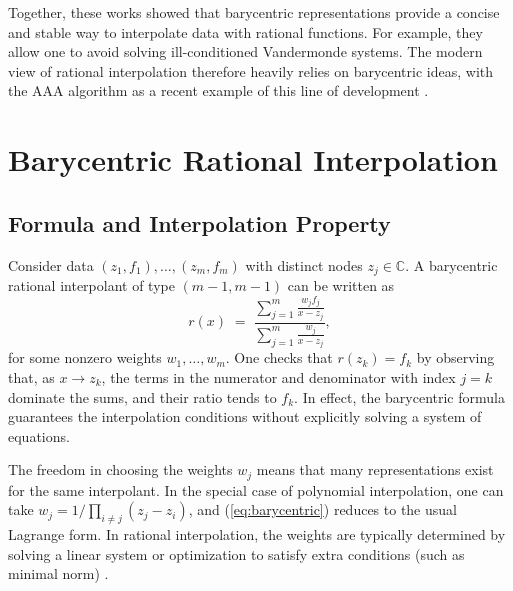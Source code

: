 \documentclass{article}
\begin{document}
Together, these works showed that barycentric representations provide a concise and stable way to interpolate data with rational functions.  For example, they allow one to avoid solving ill-conditioned Vandermonde systems.  The modern view of rational interpolation therefore heavily relies on barycentric ideas, with the AAA algorithm as a recent example of this line of development \cite{Nakatsukasa2018}. 

\section{Barycentric Rational Interpolation}
\subsection{Formula and Interpolation Property}
Consider data $(z_1,f_1),\dots,(z_m,f_m)$ with distinct nodes $z_j\in\mathbb{C}$. A barycentric rational interpolant of type $(m-1,m-1)$ can be written as
\begin{equation}\label{eq:barycentric}
r(x) \;=\; \frac{\displaystyle\sum_{j=1}^m \frac{w_j f_j}{x - z_j}}
             {\displaystyle\sum_{j=1}^m \frac{w_j}{x - z_j}},
\end{equation}
for some nonzero weights $w_1,\dots,w_m$.  One checks that $r(z_k)=f_k$ by observing that, as $x\to z_k$, the terms in the numerator and denominator with index $j=k$ dominate the sums, and their ratio tends to $f_k$.  In effect, the barycentric formula guarantees the interpolation conditions without explicitly solving a system of equations.

The freedom in choosing the weights $w_j$ means that many representations exist for the same interpolant.  In the special case of polynomial interpolation, one can take $w_j = 1/\prod_{i\neq j}(z_j - z_i)$, and (\ref{eq:barycentric}) reduces to the usual Lagrange form.  In rational interpolation, the weights are typically determined by solving a linear system or optimization to satisfy extra conditions (such as minimal norm) \cite{BerrutMittelmann1997}.
\end{document}
